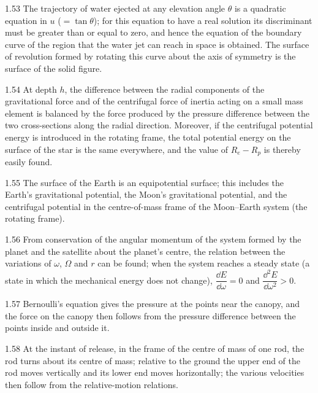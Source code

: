 \begin{hint}{1.53}
The trajectory of water ejected at any elevation angle $\theta$ is a quadratic equation in $u$ ($=\tan\theta$); for this equation to have a real solution its discriminant must be greater than or equal to zero, and hence the equation of the boundary curve of the region that the water jet can reach in space is obtained. The surface of revolution formed by rotating this curve about the axis of symmetry is the surface of the solid figure.
\end{hint}

\begin{hint}{1.54}
At depth $h$, the difference between the radial components of the gravitational force and of the centrifugal force of inertia acting on a small mass element is balanced by the force produced by the pressure difference between the two cross-sections along the radial direction. Moreover, if the centrifugal potential energy is introduced in the rotating frame, the total potential energy on the surface of the star is the same everywhere, and the value of $R_e-R_p$ is thereby easily found.
\end{hint}

\begin{hint}{1.55}
The surface of the Earth is an equipotential surface; this includes the Earth's gravitational potential, the Moon's gravitational potential, and the centrifugal potential in the centre-of-mass frame of the Moon--Earth system (the rotating frame).
\end{hint}

\begin{hint}{1.56}
From conservation of the angular momentum of the system formed by the planet and the satellite about the planet's centre, the relation between the variations of $\omega$, $\Omega$ and $r$ can be found; when the system reaches a steady state (a state in which the mechanical energy does not change), $\dfrac{\dd E}{\dd\omega}=0$ and $\dfrac{\dd^2E}{\dd\omega^2}>0$.
\end{hint}

\begin{hint}{1.57}
Bernoulli's equation gives the pressure at the points near the canopy, and the force on the canopy then follows from the pressure difference between the points inside and outside it.
\end{hint}

\begin{hint}{1.58}
At the instant of release, in the frame of the centre of mass of one rod, the rod turns about its centre of mass; relative to the ground the upper end of the rod moves vertically and its lower end moves horizontally; the various velocities then follow from the relative-motion relations.
\end{hint}

